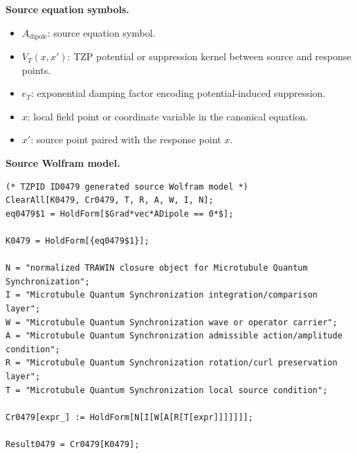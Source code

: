 \begin{minipage}[t]{0.49\linewidth}
\begingroup
\small
\raggedright
\textbf{Source equation symbols.}\par
\begin{itemize}[leftmargin=1.35em,itemsep=1pt,topsep=1pt,parsep=0pt]
    \item $A_{\mathrm{dipole}}$: source equation symbol.
    \item $V_{T}(x,x')$: TZP potential or suppression kernel between source and response points.
    \item $e_T$: exponential damping factor encoding potential-induced suppression.
    \item $x$: local field point or coordinate variable in the canonical equation.
    \item $x'$: source point paired with the response point $x$.
\end{itemize}
\endgroup
\end{minipage}\hfill
\begin{minipage}[t]{0.47\linewidth}
\begingroup
\scriptsize
\raggedright
\textbf{Source Wolfram model.}\par
\begin{Verbatim}[fontsize=\tiny,breaklines=true,breakanywhere=true]
(* TZPID ID0479 generated source Wolfram model *)
ClearAll[K0479, Cr0479, T, R, A, W, I, N];
eq0479$1 = HoldForm[$Grad*vec*ADipole == 0*$];

K0479 = HoldForm[{eq0479$1}];

N = "normalized TRAWIN closure object for Microtubule Quantum Synchronization";
I = "Microtubule Quantum Synchronization integration/comparison layer";
W = "Microtubule Quantum Synchronization wave or operator carrier";
A = "Microtubule Quantum Synchronization admissible action/amplitude condition";
R = "Microtubule Quantum Synchronization rotation/curl preservation layer";
T = "Microtubule Quantum Synchronization local source condition";

Cr0479[expr_] := HoldForm[N[I[W[A[R[T[expr]]]]]]];

Result0479 = Cr0479[K0479];
\end{Verbatim}
\endgroup
\end{minipage}

